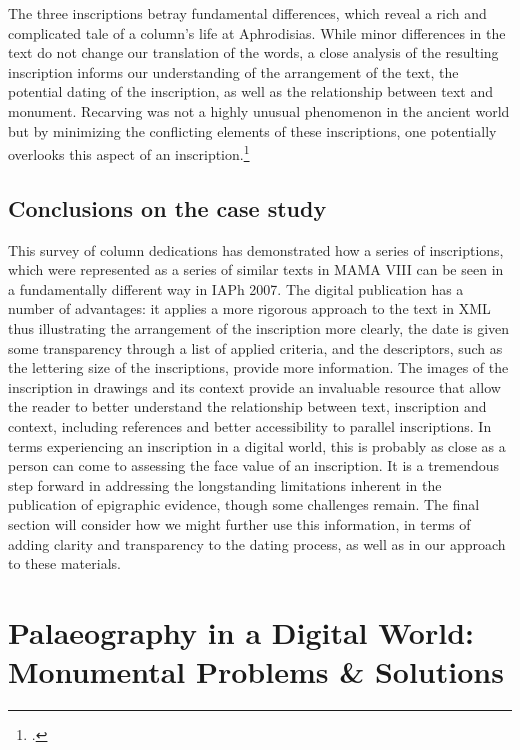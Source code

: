 \documentclass[amsthm,ebook]{saparticle}
\begin{document}
The three inscriptions betray fundamental differences, which reveal a rich and complicated tale of a column’s life at
Aphrodisias. While minor differences in the text do not change our translation of the words, a close analysis of the
resulting inscription informs our understanding of the arrangement of the text, the potential dating of the
inscription, as well as the relationship between text and monument. Recarving was not a highly unusual phenomenon in
the ancient world but by minimizing the conflicting elements of these inscriptions, one potentially overlooks this
aspect of an inscription.\footnote{\citet[135-177]{thomas1990}.} 




\subsection{Conclusions on the case study}
\noindent This survey of column dedications has demonstrated how a series of inscriptions, which were represented as a series of
similar texts in MAMA VIII can be seen in a fundamentally different way in IAPh 2007. The digital publication has a
number of advantages: it applies a more rigorous approach to the text in XML thus illustrating the arrangement of the
inscription more clearly, the date is given some transparency through a list of applied criteria, and the descriptors, such
as the lettering size of the inscriptions, provide more information. The images of the inscription in drawings and its
context provide an invaluable resource that allow the reader to better understand the relationship between text,
inscription and context, including references and better accessibility to parallel inscriptions. In terms experiencing
an inscription in a digital world, this is probably as close as a person can come to assessing the face value of an
inscription. It is a tremendous step forward in addressing the longstanding limitations inherent in the publication
of epigraphic evidence, though some challenges remain. The final section will consider how we might further use this
information, in terms of adding clarity and transparency to the dating process, as well as in our approach to these
materials.




\section{Palaeography in a Digital World: Monumental Problems \& Solutions}
\end{document}
